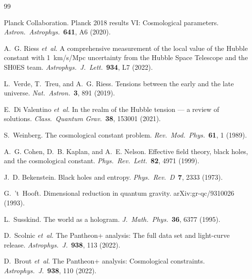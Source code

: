 \documentclass[12pt,a4paper]{article}
\begin{document}
\begin{thebibliography}{99}

Planck Collaboration.
\newblock Planck 2018 results VI: Cosmological parameters.
\newblock \textit{Astron.\ Astrophys.}\ \textbf{641}, A6 (2020).

A.~G. Riess \textit{et~al.}
\newblock A comprehensive measurement of the local value of the Hubble constant with 1~km/s/Mpc uncertainty from the Hubble Space Telescope and the SH0ES team.
\newblock \textit{Astrophys.\ J.\ Lett.}\ \textbf{934}, L7 (2022).

L.~Verde, T.~Treu, and A.~G. Riess.
\newblock Tensions between the early and the late universe.
\newblock \textit{Nat.\ Astron.}\ \textbf{3}, 891 (2019).

E.~Di Valentino \textit{et~al.}
\newblock In the realm of the Hubble tension --- a review of solutions.
\newblock \textit{Class.\ Quantum Grav.}\ \textbf{38}, 153001 (2021).

S.~Weinberg.
\newblock The cosmological constant problem.
\newblock \textit{Rev.\ Mod.\ Phys.}\ \textbf{61}, 1 (1989).

A.~G. Cohen, D.~B. Kaplan, and A.~E. Nelson.
\newblock Effective field theory, black holes, and the cosmological constant.
\newblock \textit{Phys.\ Rev.\ Lett.}\ \textbf{82}, 4971 (1999).

J.~D. Bekenstein.
\newblock Black holes and entropy.
\newblock \textit{Phys.\ Rev.\ D}\ \textbf{7}, 2333 (1973).

G.~'t~Hooft.
\newblock Dimensional reduction in quantum gravity.
\newblock arXiv:gr-qc/9310026 (1993).

L.~Susskind.
\newblock The world as a hologram.
\newblock \textit{J.\ Math.\ Phys.}\ \textbf{36}, 6377 (1995).

D.~Scolnic \textit{et~al.}
\newblock The Pantheon+ analysis: The full data set and light-curve release.
\newblock \textit{Astrophys.\ J.}\ \textbf{938}, 113 (2022).

D.~Brout \textit{et~al.}
\newblock The Pantheon+ analysis: Cosmological constraints.
\newblock \textit{Astrophys.\ J.}\ \textbf{938}, 110 (2022).


\end{thebibliography}
\end{document}
